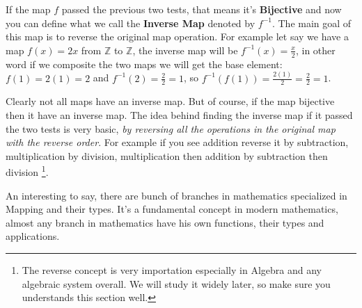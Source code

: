 If the map $f$ passed the previous two tests, that means it's {\bf Bijective} and now you can define what we call the {\bf Inverse Map} denoted by $f^{-1}$. The main goal of this map is to reverse the original map operation. For example let say we have a map $f(x)=2x$ from $\mathbb{Z}$ to $\mathbb{Z}$, the inverse map will be $f^{-1}(x)=\frac{x}{2}$, in other word if we composite the two maps we will get the base element: $f(1)=2(1)=2$ and $f^{-1}(2)=\frac{2}{2}=1$, so $f^{-1}(f(1))=\frac{2(1)}{2}=\frac{2}{2}=1$.

Clearly not all maps have an inverse map. But of course, if the map bijective then it have an inverse map. The idea behind finding the inverse map if it passed the two tests is very basic, {\it by reversing all the operations in the original map with the reverse order}. For example if you see addition reverse it by subtraction, multiplication by division, multiplication then addition by subtraction then division \footnote{The reverse concept is very importation especially in Algebra and any algebraic system overall. We will study it widely later, so make sure you understands this section well.}.

An interesting to say, there are bunch of branches in mathematics specialized in Mapping and their types. It's a fundamental concept in modern mathematics, almost any branch in mathematics have his own functions, their types and applications.